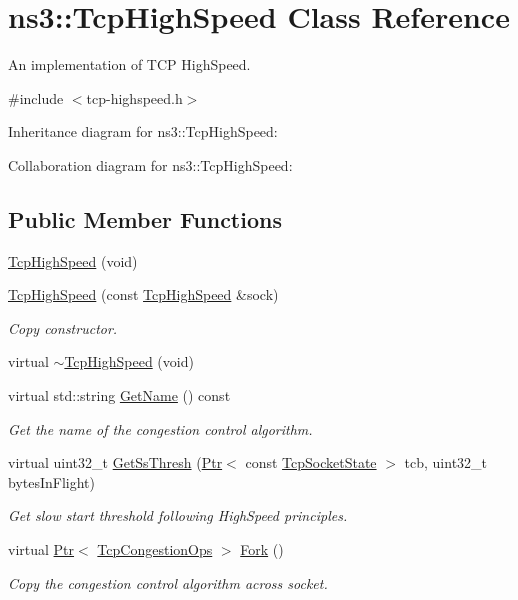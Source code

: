 \hypertarget{classns3_1_1TcpHighSpeed}{}\section{ns3\+:\+:Tcp\+High\+Speed Class Reference}
\label{classns3_1_1TcpHighSpeed}


An implementation of T\+CP High\+Speed.  




{\ttfamily \#include $<$tcp-\/highspeed.\+h$>$}



Inheritance diagram for ns3\+:\+:Tcp\+High\+Speed\+:


Collaboration diagram for ns3\+:\+:Tcp\+High\+Speed\+:
\subsection*{Public Member Functions}
\begin{DoxyCompactItemize}
\item 
\hyperlink{classns3_1_1TcpHighSpeed_a42ac971f249c1a5ea56081be385992bb}{Tcp\+High\+Speed} (void)
\item 
\hyperlink{classns3_1_1TcpHighSpeed_adc688f21d11e4d10bfcde1a4ff5fa604}{Tcp\+High\+Speed} (const \hyperlink{classns3_1_1TcpHighSpeed}{Tcp\+High\+Speed} \&sock)
\begin{DoxyCompactList}\small\item\em Copy constructor. \end{DoxyCompactList}\item 
virtual \hyperlink{classns3_1_1TcpHighSpeed_af1c599c9ae180189ff5d30833ec7d926}{$\sim$\+Tcp\+High\+Speed} (void)
\item 
virtual std\+::string \hyperlink{classns3_1_1TcpHighSpeed_a448ff7b3c5880d1ae8dba89b0f3d3745}{Get\+Name} () const 
\begin{DoxyCompactList}\small\item\em Get the name of the congestion control algorithm. \end{DoxyCompactList}\item 
virtual uint32\+\_\+t \hyperlink{classns3_1_1TcpHighSpeed_abc432f29ca437f1a62cd17d614568842}{Get\+Ss\+Thresh} (\hyperlink{classns3_1_1Ptr}{Ptr}$<$ const \hyperlink{classns3_1_1TcpSocketState}{Tcp\+Socket\+State} $>$ tcb, uint32\+\_\+t bytes\+In\+Flight)
\begin{DoxyCompactList}\small\item\em Get slow start threshold following High\+Speed principles. \end{DoxyCompactList}\item 
virtual \hyperlink{classns3_1_1Ptr}{Ptr}$<$ \hyperlink{classns3_1_1TcpCongestionOps}{Tcp\+Congestion\+Ops} $>$ \hyperlink{classns3_1_1TcpHighSpeed_a299b55baaeb60eb3a3e81f0f2a27e34f}{Fork} ()
\begin{DoxyCompactList}\small\item\em Copy the congestion control algorithm across socket. \end{DoxyCompactList}\end{DoxyCompactItemize}
